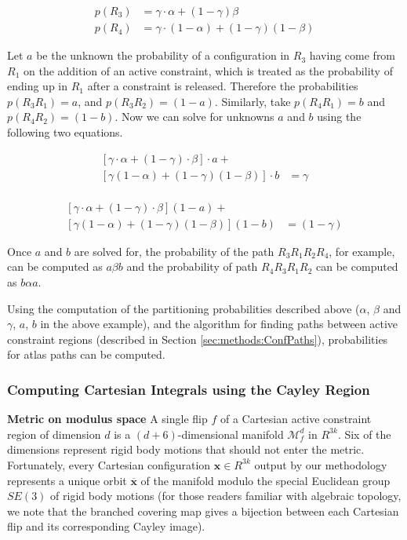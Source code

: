 \documentclass[]{article}
\newcommand{\bx}{\mathbf{x}}
\newcommand{\Mn}{\mathcal{M}}
\begin{document}
\begin{align*}
p(R_3) &= \gamma \cdot \alpha + (1 - \gamma) \beta\\
p(R_4) &= \gamma \cdot (1 - \alpha) + (1 - \gamma) (1 - \beta)
\end{align*}

Let $a$ be the unknown the probability of a configuration in $R_3$ having come from $R_1$ on 
the addition of an active constraint, which is treated as the probability of ending up in $R_1$ after a constraint is released.
Therefore the probabilities $p(R_3R_1) = a$, and $p(R_3R_2) = (1-a)$.
Similarly, take $p(R_4R_1) = b$ and $p(R_4R_2) = (1-b)$. Now we can solve for unknowns $a$ and $b$
using the following two equations.

\begin{equation*}
\begin{aligned}
[\gamma \cdot \alpha + (1 - \gamma) \cdot \beta] \cdot a + &\\
[ \gamma(1 - \alpha) + (1-\gamma) (1 - \beta)]\cdot b &= \gamma\\
\end{aligned}
\end{equation*}

\begin{equation*}
\begin{aligned}
[\gamma \cdot \alpha + (1 - \gamma) \cdot \beta] (1 - a) +&\\ 
[\gamma(1 - \alpha) + (1-\gamma) (1 - \beta)] (1-b) &= (1 - \gamma)
\end{aligned}
\end{equation*}

Once $a$ and $b$ are solved for, the probability of the path $R_3R_1R_2R_4$, for example, 
can be computed as $a\beta b$ and
the probability of path $R_4R_3R_1R_2$ can be computed as $b\alpha a$.

Using the computation of the partitioning probabilities described above ($\alpha$, $\beta$ and
$\gamma$, $a$, $b$ in the above example), and the algorithm for
finding paths between active constraint regions (described in Section
\ref{sec:methods:ConfPaths}), probabilities for atlas paths can be computed. 

\subsubsection{Computing Cartesian Integrals using the Cayley Region}
\label{sec:methods:exactVolume}
\noindent\textbf{Metric on modulus space} A single flip $f$ of a Cartesian active
constraint region of dimension $d$ is a $(d+6)$-dimensional manifold $\Mn^d_f$ in
$R^{3k}$. Six of the dimensions represent rigid body motions that should not
enter the metric. Fortunately, every Cartesian configuration $\bx \in R^{3k}$
output by our methodology represents a unique orbit $\overline{\bx}$ of the
manifold modulo the special Euclidean group $SE(3)$ of rigid body motions 
(for those readers familiar with algebraic topology, we note that the
branched covering map gives a bijection between each Cartesian flip and its
corresponding Cayley image).
\end{document}
